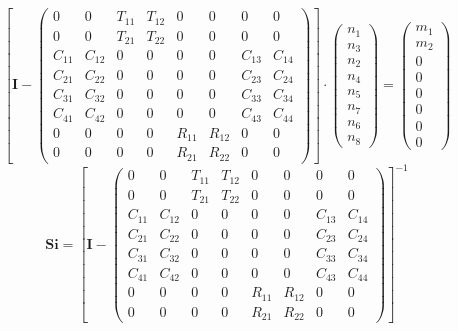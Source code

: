 \[ \left[ \mathbf{I}  - \left(\begin{smallmatrix} 0 & 0 & T_{11} & T_{12} & 0 & 0 & 0 & 0 \\ 0 & 0 & T_{21} & T_{22} & 0 & 0 & 0 & 0 \\ C_{11} & C_{12} & 0 & 0 & 0 & 0 & C_{13} & C_{14} \\ C_{21} & C_{22} & 0 & 0 & 0 & 0 & C_{23} & C_{24} \\ C_{31} & C_{32} & 0 & 0 & 0 & 0 & C_{33} & C_{34} \\ C_{41} & C_{42} & 0 & 0 & 0 & 0 & C_{43} & C_{44} \\ 0 & 0 & 0 & 0 & R_{11} & R_{12} & 0 & 0 \\ 0 & 0 & 0 & 0 & R_{21} & R_{22} & 0 & 0 \end{smallmatrix}\right)\right] \cdot \left(\begin{smallmatrix} n_{1} \\ n_{3} \\ n_{2} \\ n_{4} \\ n_{5} \\ n_{7} \\ n_{6} \\ n_{8} \end{smallmatrix}\right) = \left(\begin{smallmatrix} m_{1} \\ m_{2} \\ 0 \\ 0 \\ 0 \\ 0 \\ 0 \\ 0 \end{smallmatrix}\right) \]
\[ \mathbf{Si} = \left[ \mathbf{I}  - \left(\begin{smallmatrix} 0 & 0 & T_{11} & T_{12} & 0 & 0 & 0 & 0 \\ 0 & 0 & T_{21} & T_{22} & 0 & 0 & 0 & 0 \\ C_{11} & C_{12} & 0 & 0 & 0 & 0 & C_{13} & C_{14} \\ C_{21} & C_{22} & 0 & 0 & 0 & 0 & C_{23} & C_{24} \\ C_{31} & C_{32} & 0 & 0 & 0 & 0 & C_{33} & C_{34} \\ C_{41} & C_{42} & 0 & 0 & 0 & 0 & C_{43} & C_{44} \\ 0 & 0 & 0 & 0 & R_{11} & R_{12} & 0 & 0 \\ 0 & 0 & 0 & 0 & R_{21} & R_{22} & 0 & 0 \end{smallmatrix}\right) \right]^{-1} \]
